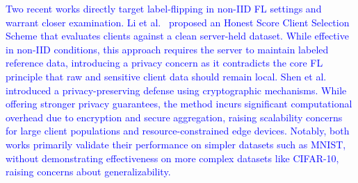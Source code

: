 \documentclass[conference]{IEEEtran}
\begin{document}
\textcolor{blue}{Two recent works directly target label-flipping in non-IID FL settings and warrant closer examination. Li et al.~\cite{li2023hscs} proposed an Honest Score Client Selection Scheme that evaluates clients against a clean server-held dataset. While effective in non-IID conditions, this approach requires the server to maintain labeled reference data, introducing a privacy concern as it  contradicts the core FL principle that raw and sensitive client data should remain local. Shen et al.~\cite{shen2024lfrppfl} introduced a privacy-preserving defense using cryptographic mechanisms. While offering stronger privacy guarantees, the method incurs significant computational overhead due to encryption and secure aggregation, raising scalability concerns for large client populations and resource-constrained edge devices. Notably, both works primarily validate their performance on simpler datasets such as MNIST, without demonstrating effectiveness on more complex datasets like CIFAR-10, raising concerns about generalizability. }


\end{document}

